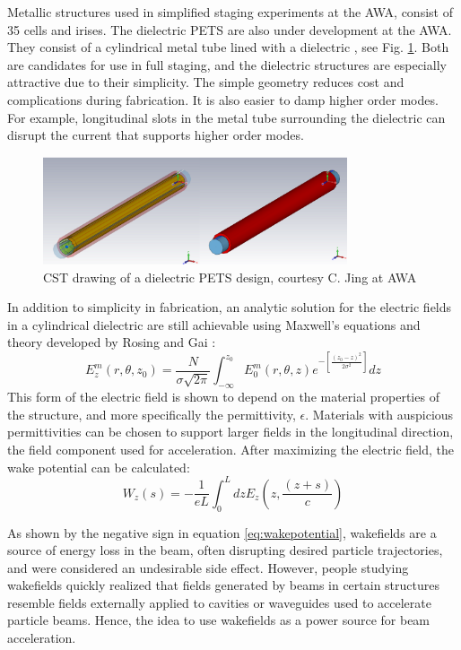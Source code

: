 Metallic structures used in simplified staging experiments at the AWA, consist of 35 cells and irises. 
The dielectric PETS are also under development at the AWA. 
They consist of a cylindrical metal tube lined with a dielectric \cite{PETSeq}, 
see Fig. \ref{fig:PETS}. Both are candidates for use in full staging, and 
the dielectric structures are especially attractive due to their simplicity. 
The simple geometry reduces cost and complications during fabrication.
It is also easier to damp higher order modes. For example, longitudinal slots in the metal tube surrounding
the dielectric can disrupt the current that supports higher order modes.   
\begin{figure}
	\begin{center}
		\includegraphics[width=0.8\textwidth]{images/pets-cst.png}
		\caption{CST drawing of a dielectric PETS design, courtesy C. Jing at AWA}
		\label{fig:PETS}
	\end{center}
\end{figure}
In addition to simplicity in fabrication, an analytic solution for the electric fields
in a cylindrical dielectric are still achievable using Maxwell's equations and theory developed
by Rosing and Gai \cite{RosingWei}:
\begin{equation}
E^m_z\left(r,\theta,z_0\right)= \frac{N}{\sigma \sqrt{2\pi}}\int_{-\infty}^{z_0}E^m_0\left(r,\theta,z\right)e^{-\left[\frac{\left(z_0-z\right)^2}{2\sigma^2}\right]}dz
\end{equation}
This form of the electric field is shown to depend 
on the material properties of the structure, and more specifically the permittivity,  $\epsilon$. 
Materials with auspicious permittivities can be chosen to support larger fields
in the longitudinal direction, the field component 
used for acceleration.   
After maximizing the electric field, the wake potential can be calculated: 
\begin{equation}
W_z\left(s\right)= -\frac{1}{eL} \int_{0}^{L} dz E_z \left(z,\frac{\left(z+s\right)}{c}\right)
\label{eq:wakepotential}
\end{equation} 

As shown by the negative sign in equation \ref{eq:wakepotential}, wakefields are a source of 
energy loss in the beam, often disrupting desired particle trajectories, 
and were considered an undesirable side effect.
However, people studying wakefields quickly realized that fields
generated by beams in certain structures resemble fields externally 
applied to cavities or waveguides used to accelerate particle beams.
Hence, the idea to use wakefields as a power source for beam acceleration. 

